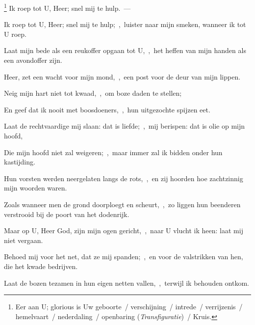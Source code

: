 \documentclass[12pt,twoside,a5paper]{article}
\begin{document}



\begin{halfparskip}
  \footnote{ Eer aan U; glorious is Uw geboorte~/ verschijning~/ intrede~/ verrijzenis~/ hemelvaart~/ nederdaling~/ openbaring (\emph{Transfiguratie})~/ Kruis.} Ik roep tot U, Heer; snel mij te hulp.~--- 

  Ik roep tot U, Heer; snel mij te hulp;~\sep\ luister naar mijn smeken, wanneer ik tot U roep.

  Laat mijn bede als een reukoffer opgaan tot U,~\sep\ het heffen van mijn handen als een avondoffer zijn.

  Heer, zet een wacht voor mijn mond,~\sep\ een post voor de deur van mijn lippen.

  Neig mijn hart niet tot kwaad,~\sep\ om boze daden te stellen;

  En geef dat ik nooit met boosdoeners,~\sep\ hun uitgezochte spijzen eet.

  Laat de rechtvaardige mij slaan: dat is liefde;~\sep\ mij berispen: dat is olie op mijn hoofd,

  Die mijn hoofd niet zal weigeren;~\sep\ maar immer zal ik bidden onder hun kastijding.

  Hun vorsten werden neergelaten langs de rots,~\sep\ en zij hoorden hoe zachtzinnig mijn woorden waren.

  Zoals wanneer men de grond doorploegt en scheurt,~\sep\ zo liggen hun beenderen verstrooid bij de poort van het dodenrijk.

  Maar op U, Heer God, zijn mijn ogen gericht,~\sep\ naar U vlucht ik heen: laat mij niet vergaan.

  Behoed mij voor het net, dat ze mij spanden;~\sep\ en voor de valstrikken van hen, die het kwade bedrijven.

  Laat de bozen tezamen in hun eigen netten vallen,~\sep\ terwijl ik behouden ontkom.
\end{halfparskip}
\end{document}
